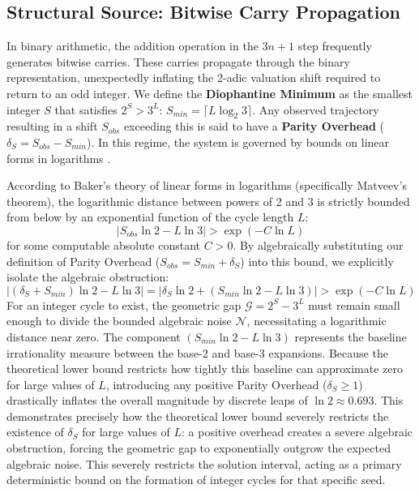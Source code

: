 \documentclass[11pt, a4paper]{article}
\theoremstyle{definition}
\begin{document}
\subsection{Structural Source: Bitwise Carry Propagation}
In binary arithmetic, the addition operation in the $3n+1$ step frequently generates bitwise carries. These carries propagate through the binary representation, unexpectedly inflating the 2-adic valuation shift required to return to an odd integer. We define the \textbf{Diophantine Minimum} as the smallest integer $S$ that satisfies $2^S > 3^L$: $S_{min} = \lceil L \log_2 3 \rceil$. Any observed trajectory resulting in a shift $S_{obs}$ exceeding this is said to have a \textbf{Parity Overhead} ($\delta_S = S_{obs} - S_{min}$). In this regime, the system is governed by bounds on linear forms in logarithms \cite{Matveev2000}.

According to Baker's theory of linear forms in logarithms (specifically Matveev's theorem), the logarithmic distance between powers of 2 and 3 is strictly bounded from below by an exponential function of the cycle length $L$:
\begin{equation}
|S_{obs} \ln 2 - L \ln 3| > \exp(-C \ln L)
\end{equation}
for some computable absolute constant $C > 0$. By algebraically substituting our definition of Parity Overhead ($S_{obs} = S_{min} + \delta_S$) into this bound, we explicitly isolate the algebraic obstruction:
\begin{equation}
|(\delta_S + S_{min}) \ln 2 - L \ln 3| = |\delta_S \ln 2 + (S_{min} \ln 2 - L \ln 3)| > \exp(-C \ln L)
\end{equation}
For an integer cycle to exist, the geometric gap $\mathcal{G} = 2^S - 3^L$ must remain small enough to divide the bounded algebraic noise $\mathcal{N}$, necessitating a logarithmic distance near zero. The component $(S_{min} \ln 2 - L \ln 3)$ represents the baseline irrationality measure between the base-2 and base-3 expansions. Because the theoretical lower bound restricts how tightly this baseline can approximate zero for large values of $L$, introducing any positive Parity Overhead ($\delta_S \ge 1$) drastically inflates the overall magnitude by discrete leaps of $\ln 2 \approx 0.693$. This demonstrates precisely how the theoretical lower bound severely restricts the existence of $\delta_{S}$ for large values of $L$: a positive overhead creates a severe algebraic obstruction, forcing the geometric gap to exponentially outgrow the expected algebraic noise. This severely restricts the solution interval, acting as a primary deterministic bound on the formation of integer cycles for that specific seed.
\end{document}
